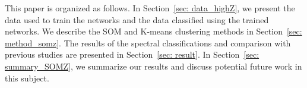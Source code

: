 This paper is organized as follows.
In Section~\ref{sec: data_highZ}, we present the data used to train the networks and the data classified using the trained networks. 
We describe the SOM and K-means clustering methods in Section~\ref{sec: method_somz}. 
The results of the spectral classifications and comparison with previous studies are presented in Section~\ref{sec: result}. 
In Section~\ref{sec: summary_SOMZ}, we summarize our results and discuss potential future work in this subject.